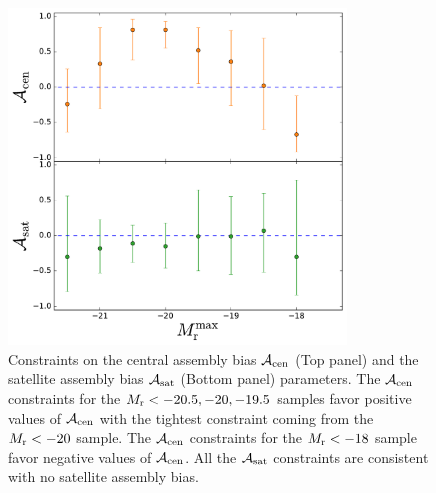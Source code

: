 \documentclass[twocolumn]{aastex61}
\newcommand{\acen}{\mathcal{A}_{\rm cen}}
\newcommand{\asat}{\mathcal{A}_{\rm sat}}
\begin{document}
\clearpage


\begin{figure}[p]~\\
\begin{center}
\includegraphics[width=0.8\textwidth]{bias2.pdf}
\caption{Constraints on the central assembly bias $\acen$ (Top panel) and the satellite assembly bias $\asat$ (Bottom panel) parameters. The $\acen$ constraints for the $M_{\rm r} < -20.5, -20, -19.5$ samples favor positive values of $\acen$ with the tightest constraint coming from the $M_{\rm r} < -20$ sample. The $\acen$ constraints for the $M_{\rm r}<-18$ sample favor negative values of $\acen$. All the $\asat$ constraints are consistent with no satellite assembly bias.}
\label{fig:bias}
\end{center}
\end{figure}

\end{document}
